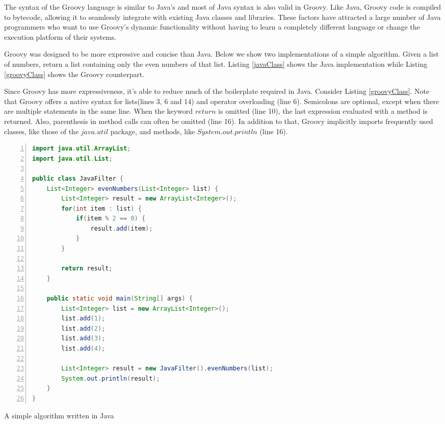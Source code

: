 \documentclass[preprint]{sigplanconf}
\begin{document}
The syntax of the Groovy language is similar to Java's and most of Java syntax is also valid in Groovy.
Like Java, Groovy code is compiled to bytecode, allowing it to seamlessly integrate with existing Java classes and libraries. 
These factors have attracted a large number of Java programmers who want to use Groovy's dynamic functionality without having to learn a completely different language or change the execution platform of their systems. 

Groovy was designed to be more expressive and concise than Java.
Below we show two implementations of a simple algorithm.
Given a list of numbers, return a list containing only the even numbers of that list.
Listing \ref{javaClass} shows the Java implementation while Listing \ref{groovyClass} shows the Groovy counterpart. 

Since Groovy has more expressiveness, it's able to reduce much of the boilerplate required in Java.
Consider Listing \ref{groovyClass}.
Note that Groovy offers a native syntax for lists(lines 3, 6 and 14) and operator overloading (line 6). 
Semicolons are optional, except when there are multiple statements in the same line. 
When the keyword $return$ is omitted (line 10), the last expression evaluated with a method is returned. 
Also, parenthesis in method calls can often be omitted (line 16).
In addition to that, Groovy implicitly imports frequently used classes, like those of the $java.util$ package, and methods, like $System.out.println$ (line 16).

\begin{Listing}[ht]
\begin{lstlisting}[language=Java,tabsize=2,breaklines=true,numbers=left]
import java.util.ArrayList;
import java.util.List;

public class JavaFilter {
	List<Integer> evenNumbers(List<Integer> list) {
		List<Integer> result = new ArrayList<Integer>();
		for(int item : list) {
			if(item % 2 == 0) {
				result.add(item);
			}
		}

		return result;
	}

	public static void main(String[] args) {
		List<Integer> list = new ArrayList<Integer>();
		list.add(1);
		list.add(2);
		list.add(3);
		list.add(4);

		List<Integer> result = new JavaFilter().evenNumbers(list);
		System.out.println(result);
	}
}
\end{lstlisting}
\caption{A simple algorithm written in Java}
\label{javaClass}
\end{Listing}
\end{document}
